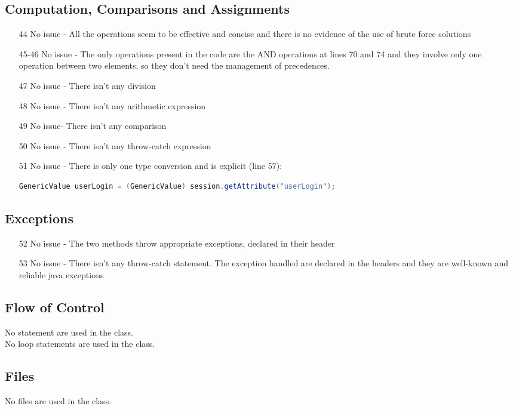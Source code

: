 \subsection{Computation, Comparisons and Assignments}
\begin{itemize}
\item[44] No issue - All the operations seem to be effective and concise and there is no evidence of the use of brute force solutions
\item[45-46] No issue - The only operations present in the code are the AND operations at lines 70 and 74 and they involve only one operation between two elements, so they don't need the management of precedences.
\item[47] No issue - There isn't any division
\item[48] No issue - There isn't any arithmetic expression
\item[49] No issue- There isn't any comparison
\item[50] No issue - There isn't any throw-catch expression
\item[51] No issue - There is only one type conversion and is explicit (line 57):
\begin{lstlisting}[language=java]
GenericValue userLogin = (GenericValue) session.getAttribute("userLogin");
\end{lstlisting}
\end{itemize}
\subsection{Exceptions}
\begin{itemize}
\item[52] No issue - The two methods throw appropriate exceptions, declared in their header
\item[53] No issue - There isn't any throw-catch statement. The exception handled are declared in the headers and they are well-known and reliable java exceptions 
\end{itemize}
\subsection{Flow of Control}
No  statement are used in the class.\\
No loop statements are used in the class.
\subsection{Files}
No files are used in the class.
